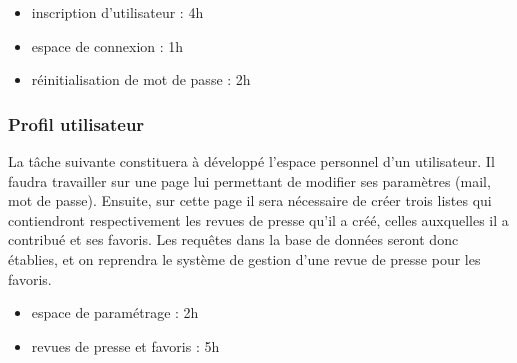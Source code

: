 			\begin{itemize}
				\item inscription d'utilisateur : 4h
				\item espace de connexion : 1h
				\item réinitialisation de mot de passe : 2h
			\end{itemize}

		\subsubsection{Profil utilisateur}
		\label{subsubsec:util_profil}
			La tâche suivante constituera à développé l'espace personnel d'un utilisateur. Il faudra travailler sur une page lui permettant de modifier ses paramètres (mail, mot de passe). Ensuite, sur cette page il sera nécessaire de créer trois listes qui contiendront respectivement les revues de presse qu'il a créé, celles auxquelles il a contribué et ses favoris. Les requêtes dans la base de données seront donc établies, et on reprendra le système de gestion d'une revue de presse pour les favoris.

			\begin{itemize}
				\item espace de paramétrage : 2h
				\item revues de presse et favoris : 5h
			\end{itemize}